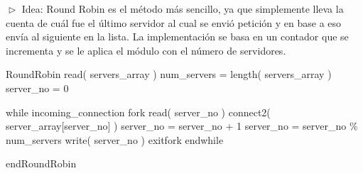 
$\vartriangleright$ Idea: Round Robin es el método más sencillo, ya que simplemente lleva la cuenta de cuál fue el último servidor al cual se envió
petición y en base a eso envía al siguiente en la lista. La implementación se basa en un contador que se incrementa y se le aplica el módulo con
el número de servidores.\\
\begin{verbatimtab}[\myTabs]

RoundRobin
read( servers_array )
	num_servers = length( servers_array )
	server_no = 0
	
	while incoming_connection
		fork
			read( server_no )
			connect2( server_array[server_no] )
			server_no = server_no + 1
			server_no = server_no \% num_servers
			write( server_no )
		exitfork
	endwhile

endRoundRobin\\
\end{verbatimtab}\\


